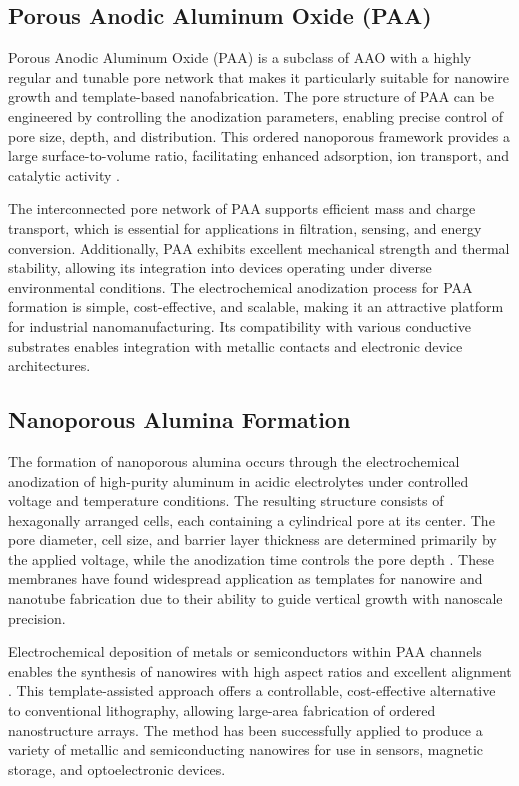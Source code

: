 \documentclass{rapportCS}
\begin{document}
	\subsection{Porous Anodic Aluminum Oxide (PAA)}
	Porous Anodic Aluminum Oxide (PAA) is a subclass of AAO with a highly regular and tunable pore network that makes it particularly suitable for nanowire growth and template-based nanofabrication. The pore structure of PAA can be engineered by controlling the anodization parameters, enabling precise control of pore size, depth, and distribution. This ordered nanoporous framework provides a large surface-to-volume ratio, facilitating enhanced adsorption, ion transport, and catalytic activity \cite{eessaa2023review}.

	The interconnected pore network of PAA supports efficient mass and charge transport, which is essential for applications in filtration, sensing, and energy conversion. Additionally, PAA exhibits excellent mechanical strength and thermal stability, allowing its integration into devices operating under diverse environmental conditions. The electrochemical anodization process for PAA formation is simple, cost-effective, and scalable, making it an attractive platform for industrial nanomanufacturing. Its compatibility with various conductive substrates enables integration with metallic contacts and electronic device architectures.

	\subsection{Nanoporous Alumina Formation}
	The formation of nanoporous alumina occurs through the electrochemical anodization of high-purity aluminum in acidic electrolytes under controlled voltage and temperature conditions. The resulting structure consists of hexagonally arranged cells, each containing a cylindrical pore at its center. The pore diameter, cell size, and barrier layer thickness are determined primarily by the applied voltage, while the anodization time controls the pore depth \cite{eessaa2023review}. These membranes have found widespread application as templates for nanowire and nanotube fabrication due to their ability to guide vertical growth with nanoscale precision.

	Electrochemical deposition of metals or semiconductors within PAA channels enables the synthesis of nanowires with high aspect ratios and excellent alignment \cite{eessaa2023review}. This template-assisted approach offers a controllable, cost-effective alternative to conventional lithography, allowing large-area fabrication of ordered nanostructure arrays. The method has been successfully applied to produce a variety of metallic and semiconducting nanowires for use in sensors, magnetic storage, and optoelectronic devices.
\end{document}
